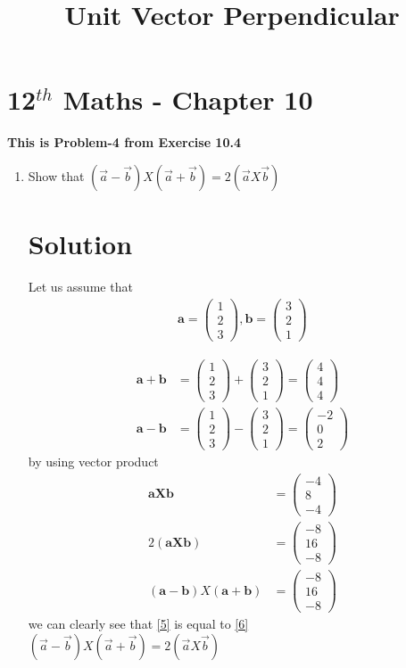 \documentclass[12pt]{article}
\newcommand{\myvec}[1]{\ensuremath{\begin{pmatrix}#1\end{pmatrix}}}
\let\vec\mathbf
\begin{document}
\begin{center}
\title{\textbf{  Unit Vector Perpendicular}}
\date{\vspace{-5ex}} %
\maketitle
\end{center}
\setcounter{page}{1}
\section{12$^{th}$ Maths - Chapter 10}
\textbf{This is Problem-4 from Exercise 10.4}
\begin{enumerate}

\item Show that $(\overrightarrow{a}-\overrightarrow{b})X(\overrightarrow{a}+\overrightarrow{b})=2(\overrightarrow{a}X\overrightarrow{b})$ 
\section{Solution}
Let us assume that 
\begin{align}
\vec{a}=\myvec{1\\2\\3},
\vec{b}=\myvec{3\\2\\1}
\end{align}

\begin{align}
\vec{a+b}&=\myvec{1\\2\\3}+\myvec{3\\2\\1}=\myvec{4\\4\\4}\\
\vec{a-b}&=\myvec{1\\2\\3}-\myvec{3\\2\\1}=\myvec{-2\\0\\2}
\end{align}
by using vector product
\begin{align}
\vec{a X b}&= \myvec{-4\\8\\-4}\\
2(\vec{a X b})&= \myvec{-8\\16\\-8}\label{5}\\
(\vec{a-b}) X (\vec{a+b})&=\myvec{-8\\16\\-8}\label{6}
\end{align}
we can clearly see that \eqref{5} is equal to \eqref{6} \\
$(\overrightarrow{a}-\overrightarrow{b})X(\overrightarrow{a}+\overrightarrow{b})=2(\overrightarrow{a}X\overrightarrow{b})$
\end{enumerate} 
\end{document}
